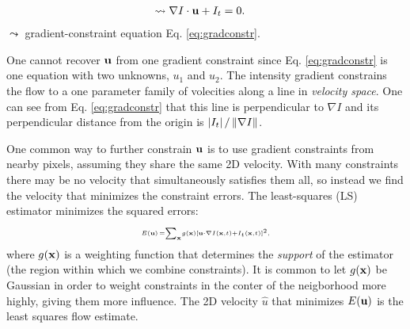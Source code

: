 \begin{compactdesc}
\begin{align}
		\leadsto\nabla I\cdot \bm{\mathrm{u}}+I_t&=0.
		\label{eq:brightnessconst3}
	\end{align}
	$\leadsto$ gradient-constraint equation Eq. \ref{eq:gradconstr}.
\item[\lp{Least-Squares estimation}] One cannot recover $\bm{\mathrm{u}}$ from one gradient constraint since Eq. \ref{eq:gradconstr}  is one equation with two unknowns, $u_1$ and $u_2$. The intensity gradient constrains the flow to a one parameter family of volecities along a line in \emph{velocity space}. One can see from Eq. \ref{eq:gradconstr} that this line is perpendicular to $\nabla I$ and its perpendicular distance from the origin is $\left\lvert I_t \right\rvert/\left\lVert \nabla I \right\rVert$.

	One common way to further constrain $\bm{\mathrm{u}}$ is to use gradient constraints from nearby pixels, assuming they share the same 2D velocity. With many constraints there may be no velocity that simultaneously satisfies them all, so instead we find the velocity that minimizes the constraint errors. The least-squares (LS) estimator minimizes the squared errors:
	\begin{gather}\scriptscriptstyle
		E(\bm{\mathrm{u}})\,=\sum_{\bm{\mathrm{x}}}^{}\!g(\bm{\mathrm{x}})\left[ \bm{\mathrm{u}}\cdot \nabla I(\bm{\mathrm{x}},t)+I_t(\bm{\mathrm{x}},t) \right]^2,
		\label{eq:minsquarederrors}
	\end{gather}
	where $g(\bm{\mathrm{x}})$ is a weighting function that determines the \emph{support} of the estimator (the region within which we combine constraints). It is common to let $g(\bm{\mathrm{x}})$ be Gaussian in order to weight constraints in the conter of the neigborhood more highly, giving them more influence. The 2D velocity $\hat{u}$ that minimizes $E(\bm{\mathrm{u}})$ is the least squares flow estimate.


\end{compactdesc}
